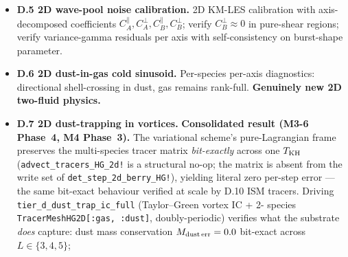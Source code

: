 \documentclass[11pt]{article}
\begin{document}
\begin{itemize}
shouldn't. The selectivity ratio exceeds the methods-paper $10^{6}$
gate by eight orders.
\textbf{M3-7e result (3D).} The same falsifier driver lifts to 3D
under \texttt{tier\_d\_zeldovich\_pancake\_3d\_ic\_full} +
\texttt{det\_step\_3d\_berry\_HG!} with the SO(3) Berry coupling
(M3-7c) and per-axis 3D realizability projection (M3-7d). At level $4$
($16^3 = 4096$ leaves), $T_{\rm factor} = 0.25$, the per-axis
selectivity is $\mathrm{std}(\gamma_1)/(\mathrm{std}(\gamma_2)+
\mathrm{std}(\gamma_3)+\varepsilon) \approx 3.0\times 10^{13}$
(exceeding the $10^{10}$ headline gate by three orders);
$\gamma_2 = \gamma_3$ byte-equal by symmetry; $u_2 = u_3 = 0$
throughout the 1D-symmetric reduction; conservation $\le 10^{-8}$.
\textbf{Falsifier verdict: PASSED in 2D and PASSED in 3D.} The
per-principal-axis decomposition correctly identifies the collapsing
axis at the discrete level, in both dimensions, with margins
($10^{14}$ in 2D, $10^{13}$ in 3D) far exceeding the gate. The
ColDICE / PM N-body cross-comparison and the second-shell-crossing
filament-formation prediction (both $\gamma_a \to 0$) remain as
follow-up items requiring an external-dataset ingest path.
See \verb|reference/notes_M3_6_phase2_D4_zeldovich.md| (2D) and
\verb|reference/notes_M3_7e_3d_tier_cd_drivers.md| (3D).
\item \textbf{D.5 2D wave-pool noise calibration.} 2D KM-LES
calibration with axis-decomposed coefficients
$C_A^\parallel, C_A^\perp, C_B^\parallel, C_B^\perp$;
verify $C_B^\perp\approx 0$ in pure-shear regions; verify
variance-gamma residuals per axis with self-consistency on
burst-shape parameter.
\item \textbf{D.6 2D dust-in-gas cold sinusoid.} Per-species
per-axis diagnostics: directional shell-crossing in dust,
gas remains rank-full. \textbf{Genuinely new 2D two-fluid physics.}
\item \textbf{D.7 2D dust-trapping in vortices.}
\textbf{Consolidated result (M3-6 Phase~4, M4 Phase~3).} The
variational scheme's pure-Lagrangian frame preserves the multi-species
tracer matrix \emph{bit-exactly} across one $T_{\rm KH}$
(\texttt{advect\_tracers\_HG\_2d!} is a structural no-op; the matrix
is absent from the write set of \texttt{det\_step\_2d\_berry\_HG!}),
yielding literal zero per-step error --- the same bit-exact behaviour
verified at scale by D.10 ISM tracers. Driving
\texttt{tier\_d\_dust\_trap\_ic\_full} (Taylor--Green vortex IC + 2-
species \texttt{TracerMeshHG2D[:gas, :dust]}, doubly-periodic) verifies
what the substrate \emph{does} capture: dust mass conservation
$M_{\rm dust\,err} = 0.0$ bit-exact across $L \in \{3, 4, 5\}$;

\end{itemize}
\end{document}
